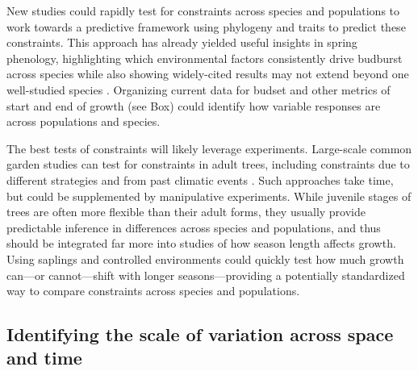 \documentclass[11pt]{article}
\newcommand{\R}[1]{\label{#1}\linelabel{#1}}
\begin{document}
New studies could rapidly test for constraints across species and populations to work towards a predictive framework using phylogeny and traits to predict these constraints. This approach has already yielded useful insights in spring phenology, highlighting which environmental factors consistently drive budburst across species while also showing widely-cited results may not extend beyond one well-studied species \citep{morales2024phylogenetic}. Organizing current data for budset and other metrics of start and end of growth (see Box) could identify how variable responses are across populations and species. 

\R{moconstrainS}The best tests of constraints will likely leverage experiments. Large-scale common garden studies can test for constraints in adult trees, including constraints due to different strategies and from past climatic events \citep[e.g., by selecting species with different growth strategies and/or selecting populations within a species with varying past exposure to damaging early season frosts][]{charrier2015effects,tixier2020comparison}. Such approaches take time, but could be supplemented by manipulative experiments. While juvenile stages of trees are often more flexible than their adult forms, they usually provide predictable inference in differences across species and populations, and thus should be integrated far more into studies of how season length affects growth. Using saplings and controlled environments could quickly test how much growth can---or cannot---shift with longer seasons---providing a potentially standardized way to compare constraints across species and populations.\R{moconstrainE} 


\subsection*{Identifying the scale of variation across space and time} %
\end{document}
